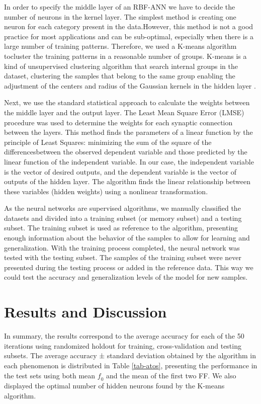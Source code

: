 In order to specify the middle layer of an RBF-ANN we have to decide the number
of neurons in the kernel layer. The simplest method is creating one neuron for
each category present in the data.However, this method is not a good practice
for most applications and can be sub-optimal, especially when there is a large
number of training patterns. Therefore, we used a K-means algorithm tocluster
the training patterns in a reasonable number of groups. K-means is a kind of
unsupervised clustering algorithm that search internal groups in the dataset,
clustering the samples that belong to the same group enabling the adjustment of
the centers and radius of the Gaussian kernels in the hidden layer
\citep{chang_2010}.

Next, we use the standard statistical approach to calculate the weights between
the middle layer and the output layer. The Least Mean Square Error (LMSE)
procedure was used to determine the weights for each synaptic connection
between the layers. This method finds the parameters of a linear function by
the principle of Least Squares: minimizing the sum of the square of the
differencesbetween the observed dependent variable and those predicted by the
linear function of the independent variable. In our case, the independent
variable is the vector of desired outputs, and the dependent variable is the
vector of outputs of the hidden layer. The algorithm finds the linear
relationship between these variables (hidden weights) using a nonlinear
transformation.

As the neural networks are supervised algorithms, we manually classified the
datasets and divided into a training subset (or memory subset) and a testing
subset. The training subset is used as reference to the algorithm, presenting
enough information about the behavior of the samples to allow for learning and
generalization. With the training process completed, the neural network was
tested with the testing subset. The samples of the training subset were never
presented during the testing process or added in the reference data. This way
we could test the accuracy and generalization levels of the model for new
samples.

\section{Results and Discussion}
In summary, the results correspond to the average accuracy for each of the 50
iterations using randomized holdout for training, cross-validation and testing
subsets. The average accuracy ± standard deviation obtained by the algorithm in
each phenomenon is distributed in Table \ref{tab-atos}, presenting the
performance in the test sets using both mean $\textit{f}_0$ and the mean of the
first two FF. We also displayed the optimal number of hidden neurons found by
the K-means algorithm.

